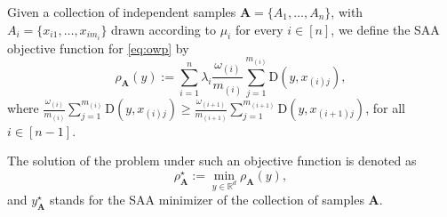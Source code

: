 \documentclass[letter,11pt, reqno]{amsart}
\renewcommand{\;}{\quad}
\theoremstyle{thmstyleone}%
\theoremstyle{thmstyletwo}%
\theoremstyle{thmstylethree}%
\begin{document}
Given a collection of independent samples $\mathbf{A}=\{A_1, \ldots, A_n\}$, with 
$A_i = \{ x_{i1}, \ldots, x_{im_i} \}$ drawn according to $\mu_i$ for every $i\in[n]$, 
we define the SAA objective function for \ref{eq:owp} by
\begin{equation*}
\label{eq:saa}
\rho_\mathbf{A}(y)
:= \sum_{i=1}^n \lambda_i
\frac{\omega_{(i)}}{m_{(i)}}
\sum_{j=1}^{m_{(i)}} \mathrm{D}(y, x_{(i)j}),
\end{equation*}
where $\frac{\omega_{(i)}}{m_{(i)}}
\sum_{j=1}^{m_{(i)}} \mathrm{D}(y, x_{(i)j}) \geq \frac{\omega_{(i+1)}}{m_{(i+1)}} \sum_{j=1}^{m_{(i+1)}} \mathrm{D}(y, x_{(i+1)j})$, for all $i \in [n-1]$.

The solution of the problem under such an objective function is denoted as
\begin{equation*}
\label{eq:saa-problem}
\rho^\star_\mathbf{A} := \min_{y \in \mathbb{R}^d} \rho_\mathbf{A}(y),
\end{equation*}
and $y^\star_\mathbf{A}$ stands for the SAA minimizer of the collection of samples $\mathbf{A}$.
\end{document}
